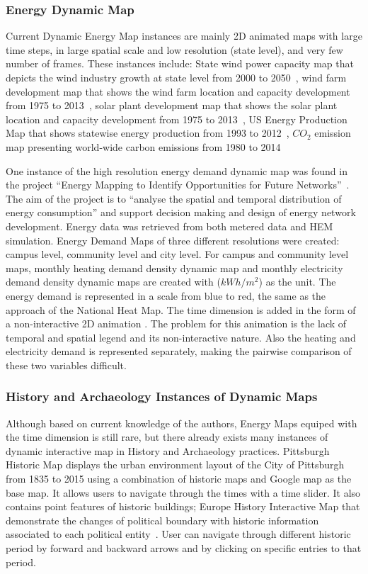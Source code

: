 \documentclass[hidelinks,12pt]{article}
\begin{document}
\subsubsection{Energy Dynamic Map}
Current Dynamic Energy Map instances are mainly 2D animated maps with
large time steps, in large spatial scale and low resolution (state
level), and very few number of frames. These instances include: State
wind power capacity map that depicts the wind industry growth at state
level from 2000 to 2050~\cite{DOEWind}, wind farm development map that
shows the wind farm location and capacity development from 1975 to
2013~\cite{DOEWindFarm}, solar plant development map that shows the
solar plant location and capacity development from 1975 to
2013~\cite{DOESolarPlant}, US Energy Production Map that shows
statewise energy production from 1993 to 2012~\cite{DOEEnergyProduct},
$CO_2$ emission map presenting world-wide carbon emissions from 1980 to
2014~\cite{CO2Atlas}

One instance of the high resolution energy demand dynamic map was
found in the project ``Energy Mapping to Identify Opportunities for
Future Networks''~\cite{Diaz2013}. The aim of the project is to
``analyse the spatial and temporal distribution of energy
consumption'' and support decision making and design of energy network
development. Energy data was retrieved from both metered data and HEM
simulation. Energy Demand Maps of three different resolutions were
created: campus level, community level and city level. For campus and
community level maps, monthly heating demand density dynamic map and
monthly electricity demand density dynamic maps are created with
($kWh/m^2$) as the unit. The energy demand is represented in a scale
from blue to red, the same as the approach of the National Heat
Map. The time dimension is added in the form of a non-interactive 2D
animation . The problem for this animation is the lack of temporal and
spatial legend and its non-interactive nature. Also the heating and
electricity demand is represented separately, making the pairwise
comparison of these two variables difficult.

\subsubsection{History and Archaeology Instances of Dynamic Maps}
Although based on current knowledge of the authors, Energy Maps
equiped with the time dimension is still rare, but there already
exists many instances of dynamic interactive map in History and
Archaeology practices. Pittsburgh Historic Map displays the urban
environment layout of the City of Pittsburgh from 1835 to 2015 using a
combination of historic maps and Google map as the base map. It allows
users to navigate through the times with a time slider. It also
contains point features of historic buildings\cite{EsriHistory2015};
Europe History Interactive Map that demonstrate the changes of
political boundary with historic information associated to each
political entity~\cite{Worldology2009}. User can navigate through
different historic period by forward and backward arrows and by
clicking on specific entries to that period.
\end{document}
